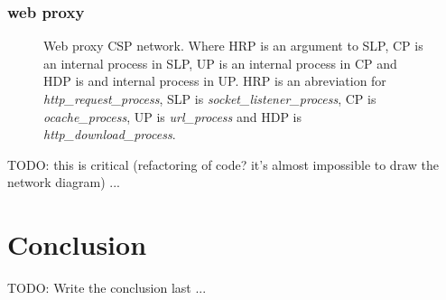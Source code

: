 \documentclass[a4paper,12pt]{article}
\begin{document}
\subsubsection{web proxy}
\begin{figure}[h]
  \begin{center}
  \end{center}
  \caption{Web proxy CSP network. Where HRP is an argument to SLP, CP is an
    internal process in SLP, UP is an internal process in CP and HDP is and
    internal process in UP. HRP is an abreviation for {\it http\_request\_process},
    SLP is {\it socket\_listener\_process}, CP is {\it ocache\_process}, UP is
    {\it url\_process} and HDP is {\it http\_download\_process}.}
  \label{webproxy}
\end{figure}


TODO: this is critical (refactoring of code? it's almost impossible to draw
the network diagram) ...

\newpage
\section{Conclusion}
\label{conclusion}

TODO: Write the conclusion last ...


\end{document}
